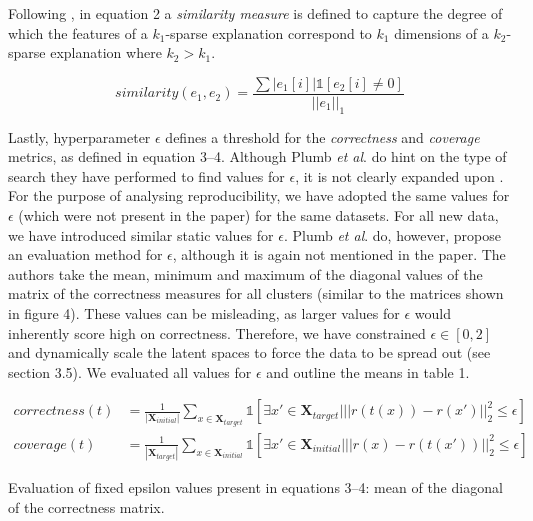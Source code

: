 Following \cite[p.~6]{plumb2020explaining}, in equation 2 a \textit{similarity measure} is defined to capture the degree of which the features of a $k_1$-sparse explanation correspond to $k_1$ dimensions of a $k_2$-sparse explanation where $k_2 > k_1$.

\begin{equation}
similarity(e_1, e_2) = \frac{\sum|e_1[i]|\mathbb{1}[e_2[i] \neq 0]}{||e_1||_1}
\end{equation}

Lastly, hyperparameter $\epsilon$ defines a threshold for the \textit{correctness} and \textit{coverage} metrics, as defined in equation 3--4. Although Plumb \textit{et al}. do hint on the type of search they have performed to find values for $\epsilon$, it is not clearly expanded upon \cite[p.~4]{plumb2020explaining}. For the purpose of analysing reproducibility, we have adopted the same values for $\epsilon$ (which were not present in the paper) for the same datasets. For all new data, we have introduced similar static values for $\epsilon$. Plumb \textit{et al}. do, however, propose an evaluation method for $\epsilon$, although it is again not mentioned in the paper. The authors take the mean, minimum and maximum of the diagonal values of the matrix of the correctness measures for all clusters (similar to the matrices shown in figure 4). These values can be misleading, as larger values for $\epsilon$ would inherently score high on correctness. Therefore, we have constrained $\epsilon \in [0, 2]$ and dynamically scale the latent spaces to force the data to be spread out (see section 3.5). We evaluated all values for $\epsilon$ and outline the means in table 1.

\begin{align}
correctness(t) &= \frac{1}{|\boldsymbol{X}_{initial}|} \sum\limits_{x \in \boldsymbol{X}_{target}} \mathbb{1} [\exists x' \in \boldsymbol{X}_{target} | || r(t(x)) - r(x')||^2_2 \leq \epsilon]\\
coverage(t) &= \frac{1}{|\boldsymbol{X}_{target}|} \sum\limits_{x \in \boldsymbol{X}_{initial}} \mathbb{1} [\exists x' \in \boldsymbol{X}_{initial} | || r(x) - r(t(x'))||^2_2 \leq \epsilon]
\end{align}

\begin{table}[h]
  \centering
  
  \caption{Evaluation of fixed epsilon values present in equations 3--4: mean of the diagonal of the correctness matrix.}
\end{table}

